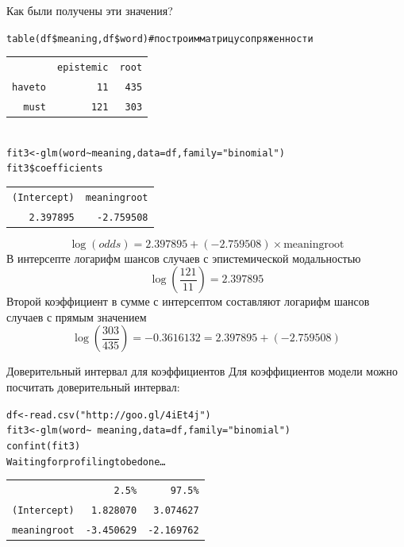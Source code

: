 \begin{frame}{Как были получены эти значения?}
\scriptsize
\begin{alltt}
table(df\$meaning, df\$word) \hfill \# построим матрицу сопряженности
\begin{tabular}{rrr}
       &   epistemic & root\\
  have to   &     11 & 435\\
  must        &  121 & 303\\
  \end{tabular}
\medskip\\
fit3 <- \alert{glm(word \textasciitilde meaning}, data = df, \alert{family = "binomial")} \\
fit3\$coefficients\\
\begin{tabular}{rr}
(Intercept) & meaningroot \\
   2.397895 &  -2.759508 \\
\end{tabular}
\end{alltt}
\normalsize
$$\log(odds)  = 2.397895 + (-2.759508) \times \mbox{meaningroot}$$
В интерсепте логарифм шансов случаев с эпистемической модальностью
$$\log\left(\frac{121}{11}\right) = 2.397895$$
Второй коэффициент в сумме с интерсептом составляют логарифм шансов случаев с прямым значением
$$\log\left(\frac{303}{435}\right) = -0.3616132 = 2.397895 + (-2.759508)$$
\end{frame}
\begin{frame}{Доверительный интервал для коэффициентов}
Для коэффициентов модели можно посчитать доверительный интервал:
\scriptsize
\begin{alltt}
df <- read.csv("http://goo.gl/4iEt4j")\\
fit3 <- \alert{glm(word \textasciitilde\ meaning}, data = df, \alert{family = "binomial")}\medskip\\
\alert{confint(fit3)}\\
Waiting for profiling to be done…\\
\begin{tabular}{rrr}
    &   2.5 \%  &  97.5 \% \\
(Intercept) & 1.828070 &  3.074627\\
meaningroot & -3.450629  & -2.169762\\
\end{tabular}
\end{alltt}
\normalsize
\end{frame}
